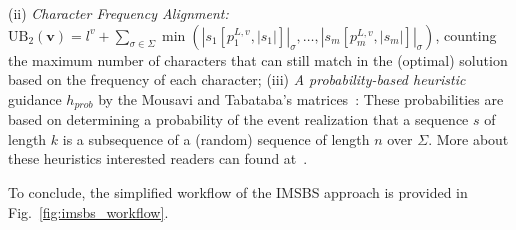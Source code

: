 \documentclass[runningheads]{llncs}
\begin{document}
(ii)  \textit{Character Frequency Alignment:}
$\textrm{UB}_2(\mathbf{v}) =  l^v + \sum_{\sigma \in \Sigma} 
\min\left(  |s_1[p_1^{L, v}, |s_1|]|_{\sigma}, \ldots, |s_m[p_m^{L, v}, |s_m|]|_{\sigma} \right)$,  counting the maximum number of characters that can still match in the (optimal) solution based on the frequency of each character; %
(iii) \textit{A probability-based heuristic} guidance $h_{prob}$ by the Mousavi and Tabataba's matrices~\cite{mousavi2012improved}:  These probabilities are based on determining a probability of the event realization that a sequence $s$ of length $k$ is a subsequence of a (random) sequence of length $n$ over $\Sigma$.  %
     More about these heuristics interested readers can found at~\cite{DJUKANOVIC2020106499,mousavi2012improved}. 
   
   To conclude, the simplified workflow of the IMSBS approach is provided in Fig.~\ref{fig:imsbs_workflow}. 
   
\end{document}

